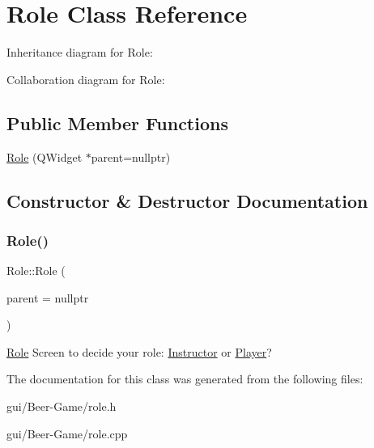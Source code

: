 \hypertarget{classRole}{}\section{Role Class Reference}
\label{classRole}


Inheritance diagram for Role\+:


Collaboration diagram for Role\+:
\subsection*{Public Member Functions}
\begin{DoxyCompactItemize}
\item 
\hyperlink{classRole_a60f61a0f01ec7c98bb6904aa8fb52866}{Role} (Q\+Widget $\ast$parent=nullptr)
\end{DoxyCompactItemize}


\subsection{Constructor \& Destructor Documentation}
\mbox{\label{classRole_a60f61a0f01ec7c98bb6904aa8fb52866}} 
\subsubsection{\texorpdfstring{Role()}{Role()}}
{\footnotesize\ttfamily Role\+::\+Role (\begin{DoxyParamCaption}\item[{Q\+Widget $\ast$}]{parent = {\ttfamily nullptr} }\end{DoxyParamCaption})\hspace{0.3cm}{\ttfamily [explicit]}}

\hyperlink{classRole}{Role} Screen to decide your role\+: \hyperlink{classInstructor}{Instructor} or \hyperlink{classPlayer}{Player}? 

The documentation for this class was generated from the following files\+:\begin{DoxyCompactItemize}
\item 
gui/\+Beer-\/\+Game/role.\+h\item 
gui/\+Beer-\/\+Game/role.\+cpp\end{DoxyCompactItemize}
